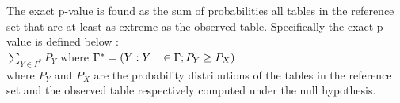 \documentclass[12pt,oneside]{report}
\theoremstyle{definition}
\theoremstyle{mystyle}
\begin{document}
The exact p-value is found as the sum of probabilities all tables in the reference set that are at least as extreme as the observed table. Specifically the exact p-value is defined below :\\
$\sum\limits_{Y \in \Gamma^{*}}P_{Y} $ \hspace{5mm} where
$\Gamma^{*}=\left(Y:Y\hspace{3mm} \in \Gamma ;P_{Y}\geq P_{X}\right)$\\
where $P_{Y}$ and $P_{X}$ are the probability distributions of the tables in the reference set and the observed table respectively computed under the null hypothesis. 

\end{document}
